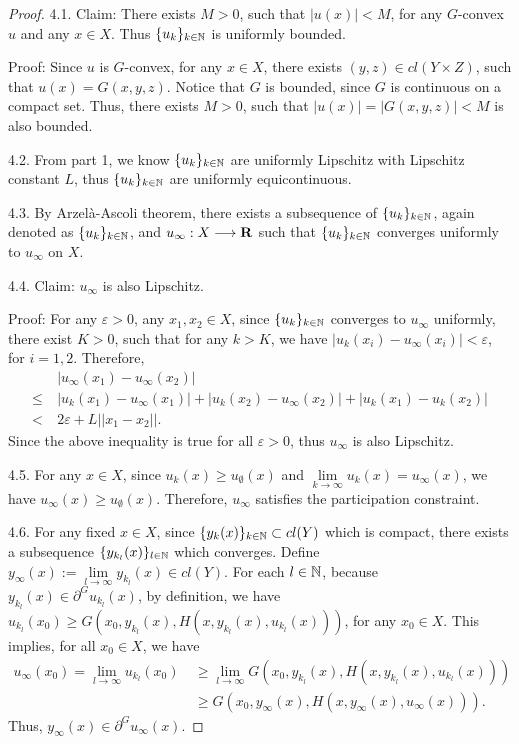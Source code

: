 \begin{proof}
	4.1. Claim: There exists $M>0$, such that $|u(x)|<M$, for any $G$-convex $u$ and any $x \in X$. Thus $\{u_k\}_{k \in \mathbb{N}}$ is uniformly bounded.
											
		Proof: Since $u$ is $G$-convex, for any $x\in X$, there exists $(y, z)\in cl( Y \times Z) $, such that $u(x) = G(x,y,z)$. Notice that $G$ is bounded, since $G$ is continuous on a compact set. Thus, there exists $M>0$, such that $|u(x)| =| G(x,y,z)|<M$ is also bounded.
											
	4.2. From part 1, we know $\{u_k\}_{k\in \mathbb{N}}$ are uniformly Lipschitz with Lipschitz constant $L$, thus $\{u_k\}_{k\in \mathbb{N}}$ are uniformly equicontinuous.
											
	4.3. By Arzel\`a-Ascoli theorem, there exists a subsequence of $\{u_k\}_{k\in \mathbb{N}}$, again denoted as $\{u_k\}_{k\in \mathbb{N}}$, and $u_{\infty} : X \longrightarrow {\mathbf R}$ such that $\{u_k\}_{k\in \mathbb{N}}$  converges uniformly to $u_{\infty}$ on $X$.
											
	4.4. Claim: $u_{\infty}$ is also Lipschitz.
											
		Proof: For any $\varepsilon >0$, any $x_1, x_2 \in X$, since $\{u_k\}_{k\in \mathbb{N}}$ converges to $u_{\infty}$ uniformly, there exist $K>0$, such that for any $k >K$, we have $|u_k(x_i) -u_{\infty}(x_i)|<\varepsilon$, for $i=1,2$. Therefore, 
			\begin{equation*}
			\begin{split}
			&~|u_{\infty}(x_1) -u_{\infty}(x_2)| \\
			\le & ~|u_k(x_1)-u_{\infty}(x_1)| + |u_k(x_2)-u_{\infty}(x_2)| + |u_k(x_1) -u_k(x_2)| \\
			< & ~2\varepsilon + L ||x_1-x_2||.
			\end{split}
			\end{equation*}
		Since the above inequality is true for all $\varepsilon >0$, thus $u_{\infty}$ is also Lipschitz.
											
	4.5. For any $x\in X$, since $u_k(x)\ge u_{\emptyset}(x)$ and $\lim\limits_{k\rightarrow \infty} u_{k}(x) = u_{\infty}(x)$, we have $u_{\infty}(x)\ge u_{\emptyset}(x)$. Therefore, $u_{\infty}$ satisfies the participation constraint.
											
	4.6. For any fixed $x\in X$, since $\{y_k(x)\}_{k \in \mathbb{N}} \subset cl(Y)$ which is compact, there exists a subsequence $\{y_{k_l}(x)\}_{l\in \mathbb{N}}$ which converges. Define $y_{\infty}(x):= \lim\limits_{l\rightarrow \infty} y_{k_l}(x) \in cl(Y)$.
	For each $l\in \mathbb{N}$, because  $y_{k_l}(x)\in \partial^G u_{k_l} (x)$, by definition, we have $u_{k_l}(x_0)\ge G(x_0, y_{k_l}(x), H(x, y_{k_l}(x), u_{k_l}(x)))$, for any $x_0\in X$. This implies, for all $x_0\in X$, we have
		\begin{equation*}
		\begin{split}
			u_{\infty}(x_0) = \lim\limits_{l \rightarrow \infty} u_{k_l}(x_0) &~\ge \lim_{l\rightarrow \infty}  G(x_0, y_{k_l}(x), H(x, y_{k_l}(x), u_{k_l}(x)))\\
			&~\ge G(x_0, y_{\infty}(x), H(x, y_{\infty}(x), u_{\infty}(x))).
		\end{split}
		\end{equation*} 
	Thus, $y_{\infty}(x) \in \partial^G u_{\infty}(x)$. 
											

\end{proof}
